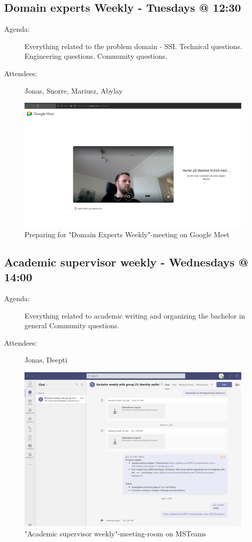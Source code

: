 \subsection{Domain experts Weekly - Tuesdays @ 12:30}

    \begin{description}
        \item[Agenda:] Everything related to the problem domain - SSI. Technical questions. Engineering questions. Community questions.
        \item[Attendees:] Jonas, Snorre, Mariusz, Abylay
    \end{description}

    \begin{figure}[htbp]
      \centering
      \includegraphics[width=.7\textwidth]{figures/googlemeet.png}
      \caption[Meeting domain experts]{Preparing for "Domain Experts Weekly"-meeting on Google Meet}
    \end{figure}
    
\subsection{Academic supervisor weekly - Wednesdays @ 14:00}
    
    \begin{description}
        \item[Agenda:] Everything related to academic writing and organizing the bachelor in general Community questions.
        \item[Attendees:] Jonas, Deepti
    \end{description}

    \begin{figure}[htbp]
      \centering
      \includegraphics[width=.7\textwidth]{figures/msteams-weekly.png}
      \caption[Meeting academic supervisor]{"Academic supervisor weekly"-meeting-room on MSTeams}
    \end{figure}
    

